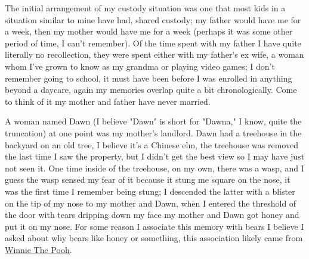 \documentclass[12pt]{article}
\begin{document}
The initial arrangement of my custody situation was one that most kids in a situation similar to mine
    have had, shared custody; my father would have me for a week, then my mother would have me for a week
    (perhaps it was some other period of time, I can't remember).
Of the time spent with my father I have quite literally no recollection, they were
    spent either with my father's ex wife, a woman whom I've grown to know as my grandma or playing video
    games; I don't remember going to school, it must have been before I was enrolled in anything beyond a
    daycare, again my memories overlap quite a bit chronologically.
Come to think of it my mother and father have never married.

A woman named Dawn (I believe "Dawn" is short for "Dawna," I know, quite the truncation) at one point was
    my mother's landlord.
Dawn had a treehouse in the backyard on an old tree, I believe it's a Chinese elm,
    the treehouse was removed the last time I saw the property, but I didn't get the best view so I may have
    just not seen it. 
One time inside of the treehouse, on my own, there was a wasp, and I guess the wasp
    sensed my fear of it because it stung me square on the nose, it was the first time I remember being
    stung; I descended the latter with a blister on the tip of my nose to my mother and Dawn, when I entered
    the threshold of the door with tears dripping down my face my mother and Dawn got honey and put it on my
    nose.
For some reason I associate this memory with bears I believe I asked about why bears like honey or something,
    this association likely came from {\color{blue}\underline{\href{https://winniethepooh.disney.com/}{Winnie
    The Pooh}}}.
\end{document}
